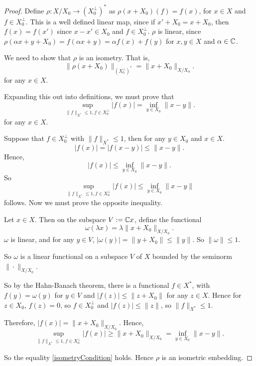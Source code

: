 \documentclass{unswmaths}
\begin{document}
\begin{proof}
    Define $\rho:X/X_0\rightarrow (X_0^\perp)^*$ as $\rho(x+X_0)(f) = f(x)$, for $x \in X$
    and $f \in X_0^\perp$. This is a well defined linear map, since if $x' + X_0 = x+X_0$, then 
    $f(x) = f(x')$ since $x-x' \in X_0$ and $f \in X_0^\perp$. $\rho$ is linear, since $\rho(\alpha x+y+X_0) = f(\alpha x+y) = \alpha f(x) + f(y)$
    for $x,y \in X$ and $\alpha \in \mathbb{C}$.
    
    
    We need to show that $\rho$ is an isometry. That is,
    \begin{equation*}
        \| \rho(x+X_0)\|_{(X_0^\perp)^*} = \| x+X_0\|_{X/X_0}.
    \end{equation*}
    for any $x \in X$.
    
    Expanding this out into definitions, we must prove that
    \begin{equation}
    \label{isometryCondition}
        \sup_{\|f\|_{X^*} \leq 1, f \in X_0^\perp} |f(x)| = \inf_{y \in X_0} \|x-y\|.
    \end{equation}
    for any $x \in X$.
    
    Suppose that $f \in X_0^\perp$ with $\|f\|_{X^*} \leq 1$, then for any $y \in X_0$
    and $x \in X$.
    \begin{equation*}
        |f(x)| = |f(x-y)| \leq \|x-y\|.
    \end{equation*}
    Hence,
    \begin{equation*}
        |f(x)| \leq \inf_{y \in X_0} \|x-y\|.
    \end{equation*}
    So
    \begin{equation*}
        \sup_{\|f\|_{X^*} \leq 1, f \in X_0^\perp} |f(x)| \leq \inf_{y \in X_0} \|x-y\|
    \end{equation*}
    follows. Now we must prove the opposite inequality. 
    
    Let $x \in X$. Then on the subspace $V := \mathbb{C} x$, define the functional
    \begin{equation*}
        \omega(\lambda x) = \lambda \|x+X_0\|_{X/X_0}.
    \end{equation*}
    $\omega$ is linear, and for any $y \in V$, $|\omega(y)| = \|y+X_0\| \leq \|y\|$.  So $\|\omega\| \leq 1$.
    
    So $\omega$ is a linear functional on a subspace $V$ of $X$ bounded by the seminorm $\|\cdot\|_{X/X_0}$. 
    
    So by the Hahn-Banach theorem, there is a functional $f \in X^*$, with $f(y) = \omega(y)$ for $y \in V$
    and $|f(z)| \leq \|z+X_0\|$ for any $z \in X$. Hence for $z \in X_0$, $f(z) = 0$, so $f \in X_0^\perp$
    and $|f(z)|\leq \|z\|$, so $\|f\|_{X^*}\leq 1$. 
    
    Therefore, $|f(x)| = \|x+X_0\|_{X/X_0}$. Hence, 
    \begin{equation*}
        \sup_{\|f\|_{X^*} \leq 1, f \in X_0^\perp} |f(x)| \geq \|x+X_0\|_{X/X_0} =  \inf_{y \in X_0} \|x-y\|.
    \end{equation*}
    
    So the equality \ref{isometryCondition} holds. Hence $\rho$ is an isometric embedding.    
\end{proof}
\end{document}
